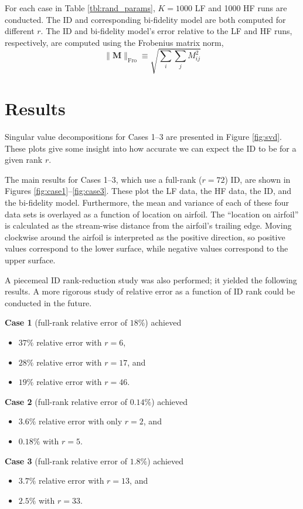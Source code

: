 \documentclass[11pt]{article}
\begin{document}
For each case in Table \ref{tbl:rand_params}, $K=1000$ LF and 1000 HF runs are conducted. The ID and corresponding bi-fidelity model are both computed for different $r$. The ID and bi-fidelity model's error relative to the LF and HF runs, respectively, are computed using the Frobenius matrix norm,
\begin{equation}
\| \bm{M} \|_\text{Fro} \equiv \sqrt{\sum_i \sum_j M_{ij}^2}
\end{equation}

\section{Results}

Singular value decompositions for Cases 1--3 are presented in Figure \ref{fig:svd}. These plots give some insight into how accurate we can expect the ID to be for a given rank $r$.

The main results for Cases 1--3, which use a full-rank ($r=72$) ID, are shown in Figures \ref{fig:case1}--\ref{fig:case3}. These plot the LF data, the HF data, the ID, and the bi-fidelity model. Furthermore, the mean and variance of each of these four data sets is overlayed as a function of location on airfoil. The ``location on airfoil'' is calculated as the stream-wise distance from the airfoil's trailing edge. Moving clockwise around the airfoil is interpreted as the positive direction, so positive values correspond to the lower surface, while negative values correspond to the upper surface.

A piecemeal ID rank-reduction study was also performed; it yielded the following results. A more rigorous study of relative error as a function of ID rank could be conducted in the future.
\begin{description}
\item{\textbf{Case 1}} (full-rank relative error of $18\%$) achieved
	\begin{itemize}
	\item $37\%$ relative error with $r=6$,
	\item $28\%$ relative error with $r=17$, and
	\item $19\%$ relative error with $r=46$.
	\end{itemize}
\item{\textbf{Case 2}} (full-rank relative error of $0.14\%$) achieved
	\begin{itemize}
	\item $3.6\%$ relative error with only $r=2$, and 
	\item $0.18\%$ with $r=5$.
	\end{itemize}
\item{\textbf{Case 3}} (full-rank relative error of $1.8\%$) achieved
	\begin{itemize}
	\item $3.7\%$ relative error with $r=13$, and
	\item $2.5\%$ with $r=33$.
	\end{itemize}
\end{description}
\end{document}
